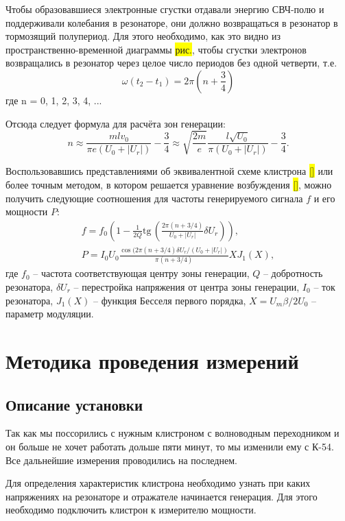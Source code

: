 \documentclass[a4paper]{article}
\renewcommand{\tan}{\mathrm{tg\,}}
\begin{document}
	Чтобы  образовавшиеся  электронные  сгустки  отдавали  энергию  СВЧ-полю и поддерживали колебания в резонаторе, они должно возвращаться в резонатор в тормозящий полупериод. Для этого необходимо, как это видно из пространственно-временной диаграммы \colorbox{yellow}{рис.},  чтобы  сгустки  электронов  возвращались  в  резонатор  через целое число периодов без одной четверти, т.е. 
	$$ \omega (t_2 - t_1) = 2\pi \left(n + \frac{3}{4}\right)$$
	где n = 0, 1, 2, 3, 4, ... 
	
	Отсюда следует формула для расчёта зон генерации:
	\begin{equation}
	n \approx \frac{mlv_0}{\pi e(U_0 + |U_r|)} - \frac{3}{4} \approx \sqrt{\frac{2m}{e}}\frac{l\sqrt{U_0}}{\pi (U_0 + |U_r|)} - \frac{3}{4}.
	\end{equation}
	
	Воспользовавшись представлениями об эквивалентной схеме клистрона \colorbox{yellow}{[]} или более точным методом, в котором решается уравнение возбуждения \colorbox{yellow}{[]}, можно получить следующие соотношения для частоты генерируемого сигнала $f$ и его мощности $P$:
	\begin{gather}
	f = f_0 \left(1 - \frac{1}{2Q} \tan \left( \frac{2\pi(n + 3/4)}{U_0 + |U_r|} \delta U_r \right)\right), \\
	P = I_0 U_0 \frac{\cos (2\pi (n + 3/4)\delta U_r/(U_0 + |U_r|)}{\pi (n + 3/4)} X J_1(X),
	\end{gather}
	где $f_0$ -- частота соответствующая центру зоны генерации, $Q$ -- добротность резонатора, $\delta U_r$ -- перестройка напряжения от центра зоны генерации, $I_0$ -- ток резонатора, $J_1(X)$ -- функция Бесселя первого порядка, $X = U_m\beta/2U_0$ -- параметр модуляции.
	
	\section{Методика проведения измерений}
	\subsection{Описание установки}
	Так как мы поссорились с нужным клистроном с волноводным переходником и он больше не хочет работать дольше пяти минут, то мы изменили ему с К-54. Все дальнейшие измерения проводились на последнем.

	Для определения характеристик клистрона необходимо узнать при каких напряжениях на резонаторе и отражателе начинается генерация. Для этого необходимо подключить клистрон к измерителю мощности.
\end{document}
